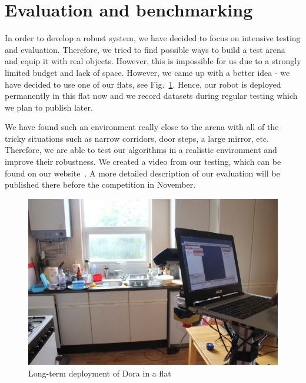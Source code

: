 \section{Evaluation and benchmarking}

In order to develop a robust system, we have decided to focus on intensive testing and evaluation. 
Therefore, we tried to find possible ways to build a test arena and equip it with real objects.
However, this is impossible for us due to a strongly limited budget and lack of space. 
However, we came up with a better idea - we have decided to use one of our flats, see Fig.~\ref{fig:kitchen}.
Hence, our robot is deployed permanently in this flat now and we record datasets during regular testing which we plan to publish later. 

We have found such an environment really close to the arena with all of the tricky situations such as narrow corridors, door steps, a large mirror, etc. 
Therefore, we are able to test our algorithms in a realistic environment and improve their robustness.
We created a video from our testing, which can be found on our website~\cite{barc_web}. A more detailed description of our evaluation will be published there before the competition in November.

\begin{figure}[ht!b]
\centering
\includegraphics[width=3.in]{kitchen.JPG}
\caption{Long-term deployment of Dora in a flat}
\label{fig:kitchen}
\end{figure}  